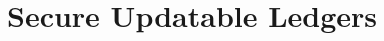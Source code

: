 \documentclass[runningheads]{llncs}
\begin{document}


\clearpage





\section{Secure Updatable Ledgers}







\appendix





\end{document}

